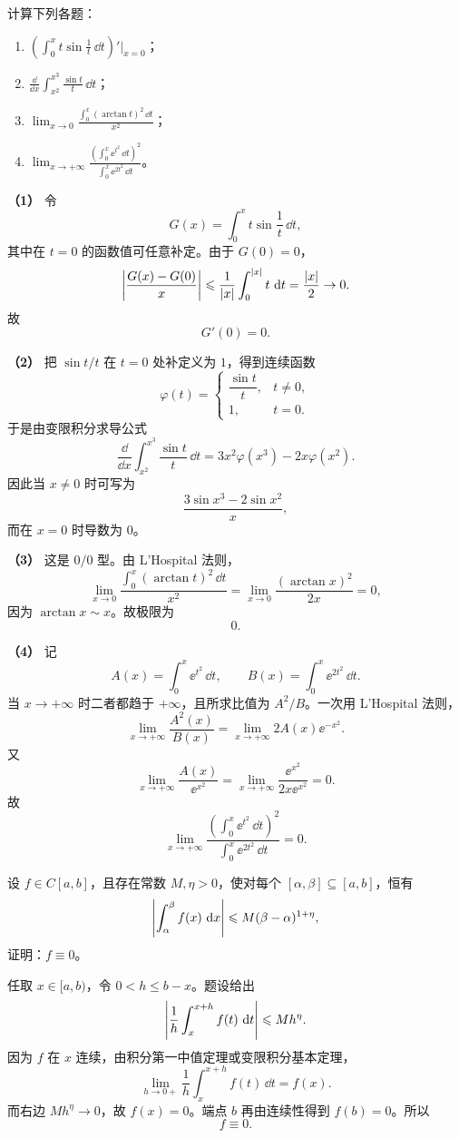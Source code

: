 \begin{xexercise}[1]
计算下列各题：
\begin{enumerate}[label=(\arabic*)]
  \item $\displaystyle\left(\int_0^x t\sin\frac1t\,\dd t\right)'\Big|_{x=0}$；
  \item $\displaystyle\frac{\dd}{\dd x}\int_{x^2}^{x^3}\frac{\sin t}{t}\,\dd t$；
  \item $\displaystyle\lim_{x\to0}\frac{\int_0^x(\arctan t)^2\,\dd t}{x^2}$；
  \item $\displaystyle\lim_{x\to+\infty}\frac{\left(\int_0^x\ee^{t^2}\,\dd t\right)^2}{\int_0^x\ee^{2t^2}\,\dd t}$。
\end{enumerate}
\end{xexercise}
\begin{xsolution}
\textbf{（1）}\quad
令
\[
  G(x)=\int_0^x t\sin\frac1t\,\dd t,
\]
其中在 $t=0$ 的函数值可任意补定。由于 $G(0)=0$，
\[
  \abs*{\frac{G(x)-G(0)}x}
  \leqslant\frac1{\abs x}\int_0^{\abs x}t\,\dd t
  =\frac{\abs x}{2}\to0.
\]
故
\[
  \boxed{G'(0)=0}.
\]

\textbf{（2）}\quad
把 $\sin t/t$ 在 $t=0$ 处补定义为 $1$，得到连续函数
\[
  \varphi(t)=
  \begin{cases}
    \dfrac{\sin t}{t},&t\ne0,\\
    1,&t=0.
  \end{cases}
\]
于是由变限积分求导公式
\[
  \frac{\dd}{\dd x}\int_{x^2}^{x^3}\frac{\sin t}{t}\,\dd t
  =3x^2\varphi(x^3)-2x\varphi(x^2).
\]
因此当 $x\ne0$ 时可写为
\[
  \boxed{\frac{3\sin x^3-2\sin x^2}{x}},
\]
而在 $x=0$ 时导数为 $0$。

\textbf{（3）}\quad
这是 $0/0$ 型。由 L'Hospital 法则，
\[
  \lim_{x\to0}\frac{\int_0^x(\arctan t)^2\,\dd t}{x^2}
  =\lim_{x\to0}\frac{(\arctan x)^2}{2x}=0,
\]
因为 $\arctan x\sim x$。故极限为
\[
  \boxed{0}.
\]

\textbf{（4）}\quad
记
\[
  A(x)=\int_0^x\ee^{t^2}\,\dd t,
  \qquad
  B(x)=\int_0^x\ee^{2t^2}\,\dd t.
\]
当 $x\to+\infty$ 时二者都趋于 $+\infty$，且所求比值为 $A^2/B$。一次用 L'Hospital 法则，
\[
  \lim_{x\to+\infty}\frac{A^2(x)}{B(x)}
  =\lim_{x\to+\infty}2A(x)\ee^{-x^2}.
\]
又
\[
  \lim_{x\to+\infty}\frac{A(x)}{\ee^{x^2}}
  =\lim_{x\to+\infty}\frac{\ee^{x^2}}{2x\ee^{x^2}}
  =0.
\]
故
\[
  \boxed{\lim_{x\to+\infty}\frac{\left(\int_0^x\ee^{t^2}\,\dd t\right)^2}
  {\int_0^x\ee^{2t^2}\,\dd t}=0}.
\]
\end{xsolution}


\begin{xexercise}[2]
设 $f\in C[a,b]$，且存在常数 $M,\eta>0$，使对每个 $[\alpha,\beta]\subseteq[a,b]$，恒有
\[
  \abs*{\int_\alpha^\beta f(x)\,\dd x}\leqslant M(\beta-\alpha)^{1+\eta},
\]
证明：$f\equiv0$。
\end{xexercise}
\begin{xsolution}
任取 $x\in[a,b)$，令 $0<h\leqslant b-x$。题设给出
\[
  \abs*{\frac1h\int_x^{x+h}f(t)\,\dd t}\leqslant Mh^\eta.
\]
因为 $f$ 在 $x$ 连续，由积分第一中值定理或变限积分基本定理，
\[
  \lim_{h\to0+}\frac1h\int_x^{x+h}f(t)\,\dd t=f(x).
\]
而右边 $Mh^\eta\to0$，故 $f(x)=0$。端点 $b$ 再由连续性得到 $f(b)=0$。所以
\[
  f\equiv0.
\]
\end{xsolution}


